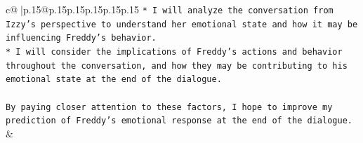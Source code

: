 \documentclass{article}
\begin{document}
{\begin{supertabular}{c@{$\;$}|p{.15\linewidth}@{}p{.15\linewidth}p{.15\linewidth}p{.15\linewidth}p{.15\linewidth}p{.15\linewidth}}
{{{\texttt{* I will analyze the conversation from Izzy's perspective to understand her emotional state and how it may be influencing Freddy's behavior.} \\
\texttt{* I will consider the implications of Freddy's actions and behavior throughout the conversation, and how they may be contributing to his emotional state at the end of the dialogue.} \\
\\ 
\texttt{By paying closer attention to these factors, I hope to improve my prediction of Freddy's emotional response at the end of the dialogue.} \\
            }
        }
    }
    & \\ \\

\end{supertabular}
}
\end{document}
